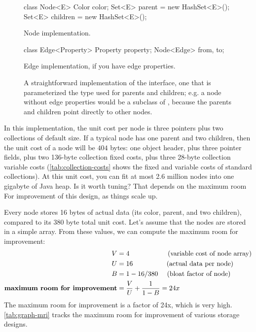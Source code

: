 \begin{figure}
\centering
\begin{subfloat}
\begin{minipage}[b]{0.59\textwidth}
\begin{framedlisting}
class Node<E> {
   Color color;
   Set<E> parent = new HashSet<E>();
   Set<E> children = new HashSet<E>();
}
\end{framedlisting}
\end{minipage}
\caption{Node implementation.}
\end{subfloat}
\begin{subfloat}
\begin{minipage}[b]{0.33\textwidth}
\begin{framedlisting}
class Edge<Property> {
   Property property;
   Node<Edge> from, to;
}
\end{framedlisting}
\end{minipage}
\caption{Edge implementation, if you have edge properties.}
\end{subfloat}
\caption{A straightforward implementation of the  interface,
one that is parameterized the type used for parents and
children; e.g. a node without edge properties would be a subclass of
, because the parents and children point directly to other
nodes.}
\label{fig:node-obvious-impl}
\end{figure}

In this implementation, the unit cost per node is three pointers plus two
collections of default size. If a typical node has one parent and two children,
then the unit cost of a node will be $404$ bytes: one object header, plus three
pointer fields, plus two 136-byte collection fixed costs, plus three 28-byte
collection variable costs (\autoref{tab:collection-costs} shows the fixed and
variable costs of standard collections). At this unit cost, you can fit at most
2.6 million nodes into one gigabyte of Java heap. Is it worth tuning? That
depends on the maximum room For improvement of this design, as things scale up.

Every node stores 16
bytes of actual data (its color, parent, and two children), compared to its 380
byte total unit cost. Let's assume that the nodes are stored in a simple array.
From these values, we can compute the maximum room for improvement:
\begin{align*}
V &= 4 ~~~~~~~~~~~~~~~~~\textrm{(variable cost of node array)}\\
U &= 16 ~~~~~~~~~~~~~~~\textrm{(actual data per node)}\\
B &= 1-16/380 ~~~~\textrm{(bloat factor of node)}\\
\textbf{\textrm{maximum room for improvement}} &= \frac{V}{U} + \frac{1}{1-B} =
24x
\end{align*}
The maximum room for improvement is a factor of 24x, which is very high.
\autoref{tab:graph-mri} tracks the maximum room for improvement of various
storage designs.

